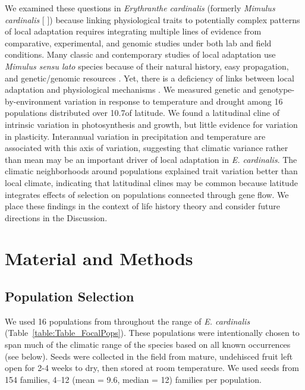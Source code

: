 \documentclass[11pt, oneside]{article}
\begin{document}
We examined these questions in \textit{Erythranthe cardinalis} (formerly \textit{Mimulus cardinalis} [\citeauthor{Nesom_2014} \citeyear{Nesom_2014}]) because linking physiological traits to potentially complex patterns of local adaptation requires integrating multiple lines of evidence from comparative, experimental, and genomic studies under both lab and field conditions. Many classic and contemporary studies of local adaptation use \textit{Mimulus sensu lato} species because of their natural history, easy propagation, and genetic/genomic resources \citep{Clausen_etal_1940, Hiesey_etal_1971, Bradshaw_Schemske_2003, Wu_etal_2008, Lowry_Willis_2010, Wright_etal_2013}. Yet, there is a deficiency of links between local adaptation and physiological mechanisms \citep{Angert_2006, Angert_etal_2008, Wu_etal_2010, Wright_etal_2013}. We measured genetic and genotype-by-environment variation in response to temperature and drought among 16 populations distributed over 10.7\textdegree of latitude. We found a latitudinal cline of intrinsic variation in photosynthesis and growth, but little evidence for variation in plasticity. Interannual variation in precipitation and temperature are associated with this axis of variation, suggesting that climatic variance rather than mean may be an important driver of local adaptation in \textit{E. cardinalis}. The climatic neighborhoods around populations explained trait variation better than local climate, indicating that latitudinal clines may be common because latitude integrates effects of selection on populations connected through gene flow. We place these findings in the context of life history theory and consider future directions in the Discussion. 

\section*{Material and Methods}


\subsection*{Population Selection}

We used 16 populations from throughout the range of \textit{E. cardinalis} (Table~\ref{table:Table_FocalPops}). These populations were intentionally chosen to span much of the climatic range of the species based on all known occurrences (see below). Seeds were collected in the field from mature, undehisced fruit left open for 2-4 weeks to dry, then stored at room temperature. We used seeds from 154 families, 4--12 (mean = 9.6, median = 12) families per population.
\end{document}
